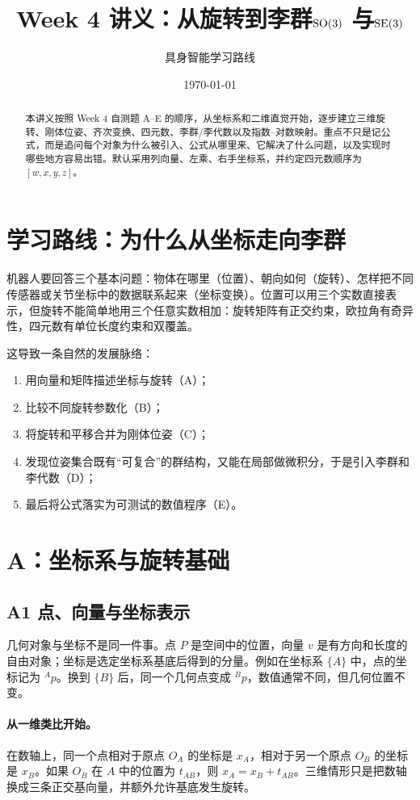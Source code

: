 \documentclass[UTF8,a4paper,11pt]{ctexart}
\title{Week 4 讲义：从旋转到李群\texorpdfstring{$\mathrm{SO}(3)$}{SO(3)} 与\texorpdfstring{$\mathrm{SE}(3)$}{SE(3)}}
\author{具身智能学习路线}
\date{\today}
\begin{document}
\maketitle
\tableofcontents

\begin{abstract}
本讲义按照 Week 4 自测题 A--E 的顺序，从坐标系和二维直觉开始，逐步建立三维旋转、刚体位姿、齐次变换、四元数、李群/李代数以及指数--对数映射。重点不只是记公式，而是追问每个对象为什么被引入、公式从哪里来、它解决了什么问题，以及实现时哪些地方容易出错。默认采用列向量、左乘、右手坐标系，并约定四元数顺序为 $[w,x,y,z]$。
\end{abstract}

\section{学习路线：为什么从坐标走向李群}
机器人要回答三个基本问题：物体在哪里（位置）、朝向如何（旋转）、怎样把不同传感器或关节坐标中的数据联系起来（坐标变换）。位置可以用三个实数直接表示，但旋转不能简单地用三个任意实数相加：旋转矩阵有正交约束，欧拉角有奇异性，四元数有单位长度约束和双覆盖。

这导致一条自然的发展脉络：
\begin{enumerate}
  \item 用向量和矩阵描述坐标与旋转（A）；
  \item 比较不同旋转参数化（B）；
  \item 将旋转和平移合并为刚体位姿（C）；
  \item 发现位姿集合既有“可复合”的群结构，又能在局部做微积分，于是引入李群和李代数（D）；
  \item 最后将公式落实为可测试的数值程序（E）。
\end{enumerate}

\section{A：坐标系与旋转基础}
\subsection{A1 点、向量与坐标表示}
几何对象与坐标不是同一件事。点 $P$ 是空间中的位置，向量 $v$ 是有方向和长度的自由对象；坐标是选定坐标系基底后得到的分量。例如在坐标系 $\{A\}$ 中，点的坐标记为 ${}^A p$。换到 $\{B\}$ 后，同一个几何点变成 ${}^B p$，数值通常不同，但几何位置不变。

\paragraph{从一维类比开始。}在数轴上，同一个点相对于原点 $O_A$ 的坐标是 $x_A$，相对于另一个原点 $O_B$ 的坐标是 $x_B$。如果 $O_B$ 在 $A$ 中的位置为 $t_{AB}$，则 $x_A=x_B+t_{AB}$。三维情形只是把数轴换成三条正交基向量，并额外允许基底发生旋转。
\end{document}
